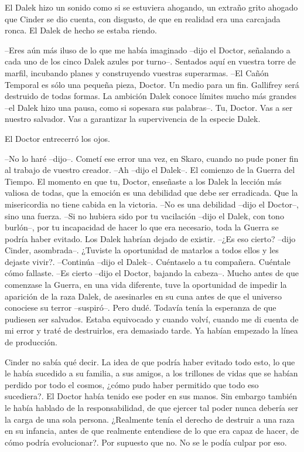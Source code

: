 El Dalek hizo un sonido como si se estuviera ahogando, un extraño grito ahogado que Cinder se dio cuenta, con disgusto, de que en realidad era una carcajada ronca. El Dalek de hecho se estaba riendo.

--Eres aún más iluso de lo que me había imaginado --dijo el Doctor, señalando a cada uno de los cinco Dalek azules por turno--. Sentados aquí en vuestra torre de marfil, incubando planes y construyendo vuestras superarmas.
--El Cañón Temporal es sólo una pequeña pieza, Doctor. Un medio para un fin. Gallifrey será destruido de todas formas. La ambición Dalek conoce límites mucho más grandes --el Dalek hizo una pausa, como si sopesara sus palabras--. Tu, Doctor. Vas a ser nuestro salvador. Vas a garantizar la supervivencia de la especie Dalek.

El Doctor entrecerró los ojos. 

--No lo haré --dijo--. Cometí ese error una vez, en Skaro, cuando no pude poner fin al trabajo de vuestro creador.
--Ah --dijo el Dalek--. El comienzo de la Guerra del Tiempo. El momento en que tu, Doctor, enseñaste a los Dalek la lección más valiosa de todas, que la emoción es una debilidad que debe ser erradicada. Que la misericordia no tiene cabida en la victoria.
--No es una debilidad --dijo el Doctor--, sino una fuerza.
--Si no hubiera sido por tu vacilación --dijo el Dalek, con tono burlón--, por tu incapacidad de hacer lo que era necesario, toda la Guerra se podría haber evitado. Los Dalek habrían dejado de existir.
--¿Es eso cierto? --dijo Cinder, asombrada--. ¿Tuviste la oportunidad de matarlos a todos ellos y les dejaste vivir?.
--Continúa --dijo el Dalek--. Cuéntaselo a tu compañera. Cuéntale cómo fallaste.
--Es cierto --dijo el Doctor, bajando la cabeza--. Mucho antes de que comenzase la Guerra, en una vida diferente, tuve la oportunidad de impedir la aparición de la raza Dalek, de asesinarles en su cuna antes de que el universo conociese su terror --suspiró--. Pero dudé. Todavía tenía la esperanza de que pudiesen ser salvados. Estaba equivocado y cuando volví, cuando me di cuenta de mi error y traté de destruirlos, era demasiado tarde. Ya habían empezado la línea de producción.

Cinder no sabía qué decir. La idea de que podría haber evitado todo esto, lo que le había sucedido a su familia, a sus amigos, a los trillones de vidas que se habían perdido por todo el cosmos, ¿cómo pudo haber permitido que todo eso sucediera?.
El Doctor había tenido ese poder en sus manos. Sin embargo también le había hablado de la responsabilidad, de que ejercer tal poder nunca debería ser la carga de una sola persona. ¿Realmente tenía el derecho de destruir a una raza en su infancia, antes de que realmente entendiese de lo que era capaz de hacer, de cómo podría evolucionar?. Por supuesto que no. No se le podía culpar por eso. 

